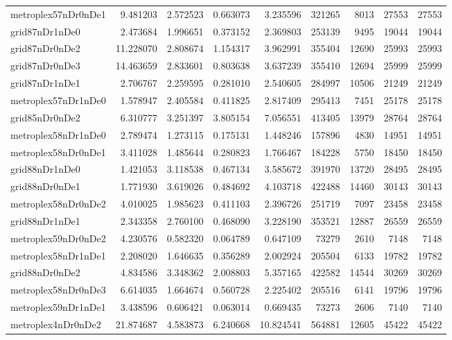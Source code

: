 \begin{longtable}{|l|r|r|r|r|r|r|r|r|}
metroplex57nDr0nDe1 & 9.481203 & 2.572523 & 0.663073 & 3.235596 & 321265 & 8013 & 27553 & 27553 \\
grid87nDr1nDe0 & 2.473684 & 1.996651 & 0.373152 & 2.369803 & 253139 & 9495 & 19044 & 19044 \\
grid87nDr0nDe2 & 11.228070 & 2.808674 & 1.154317 & 3.962991 & 355404 & 12690 & 25993 & 25993 \\
grid87nDr0nDe3 & 14.463659 & 2.833601 & 0.803638 & 3.637239 & 355410 & 12694 & 25999 & 25999 \\
grid87nDr1nDe1 & 2.706767 & 2.259595 & 0.281010 & 2.540605 & 284997 & 10506 & 21249 & 21249 \\
metroplex57nDr1nDe0 & 1.578947 & 2.405584 & 0.411825 & 2.817409 & 295413 & 7451 & 25178 & 25178 \\
grid85nDr0nDe2 & 6.310777 & 3.251397 & 3.805154 & 7.056551 & 413405 & 13979 & 28764 & 28764 \\
metroplex58nDr1nDe0 & 2.789474 & 1.273115 & 0.175131 & 1.448246 & 157896 & 4830 & 14951 & 14951 \\
metroplex58nDr0nDe1 & 3.411028 & 1.485644 & 0.280823 & 1.766467 & 184228 & 5750 & 18450 & 18450 \\
grid88nDr1nDe0 & 1.421053 & 3.118538 & 0.467134 & 3.585672 & 391970 & 13720 & 28495 & 28495 \\
grid88nDr0nDe1 & 1.771930 & 3.619026 & 0.484692 & 4.103718 & 422488 & 14460 & 30143 & 30143 \\
metroplex58nDr0nDe2 & 4.010025 & 1.985623 & 0.411103 & 2.396726 & 251719 & 7097 & 23458 & 23458 \\
grid88nDr1nDe1 & 2.343358 & 2.760100 & 0.468090 & 3.228190 & 353521 & 12887 & 26559 & 26559 \\
metroplex59nDr0nDe2 & 4.230576 & 0.582320 & 0.064789 & 0.647109 & 73279 & 2610 & 7148 & 7148 \\
metroplex58nDr1nDe1 & 2.208020 & 1.646635 & 0.356289 & 2.002924 & 205504 & 6133 & 19782 & 19782 \\
grid88nDr0nDe2 & 4.834586 & 3.348362 & 2.008803 & 5.357165 & 422582 & 14544 & 30269 & 30269 \\
metroplex58nDr0nDe3 & 6.614035 & 1.664674 & 0.560728 & 2.225402 & 205516 & 6141 & 19796 & 19796 \\
metroplex59nDr1nDe1 & 3.438596 & 0.606421 & 0.063014 & 0.669435 & 73273 & 2606 & 7140 & 7140 \\
metroplex4nDr0nDe2 & 21.874687 & 4.583873 & 6.240668 & 10.824541 & 564881 & 12605 & 45422 & 45422 \\

\end{longtable}
